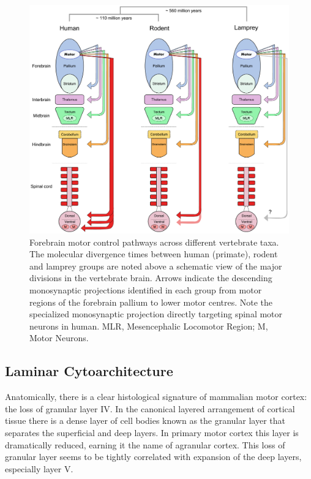 \begin{figure}
\begin{center}
\includegraphics[width=\columnwidth]{chapters/figuresChTeleology/descendingTaxa}
\end{center}
\vspace{-5mm}
\caption{Forebrain motor control pathways across different vertebrate taxa. The molecular divergence times between human (primate), rodent and lamprey groups \protect\cite{Kumar1998} are noted above a schematic view of the major divisions in the vertebrate brain. Arrows indicate the descending monosynaptic projections identified in each group from motor regions of the forebrain pallium to lower motor centres. Note the specialized monosynaptic projection directly targeting spinal motor neurons in human. MLR, Mesencephalic Locomotor Region; M, Motor Neurons.}
\label{fig:descendingTaxa}
\end{figure}

\subsection{Laminar Cytoarchitecture}

Anatomically, there is a clear histological signature of mammalian motor cortex: the loss of granular layer IV. In the canonical layered arrangement of cortical tissue there is a dense layer of cell bodies known as the granular layer that separates the superficial and deep layers. In primary motor cortex this layer is dramatically reduced, earning it the name of agranular cortex. This loss of granular layer seems to be tightly correlated with expansion of the deep layers, especially layer V.

